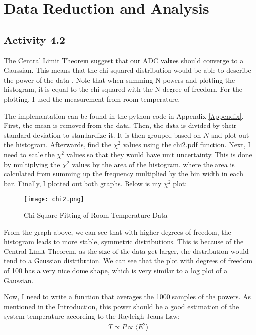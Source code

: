 \documentclass[10pt, preprint]{aastex}
\begin{document}
\section{Data Reduction and Analysis}\label{sec:reduction}

\subsection{Activity 4.2}

The Central Limit Theorem suggest that our ADC values should converge to a Gaussian. This means that the chi-squared distribution would be able to describe the power of the data \cite{labmanual}. Note that when summing N powers and plotting the histogram, it is equal to the chi-squared with the N degree of freedom. For the plotting, I used the measurement from room temperature. 

The implementation can be found in the python code in Appendix \ref{Appendix}. First, the mean is removed from the data. Then, the data is divided by their standard deviation to standardize it. It is then grouped based on $N$ and plot out the histogram. Afterwards, find the $\chi^2$ values using the chi2.pdf function. Next, I need to scale the $\chi^2$ values so that they would have unit uncertainty. This is done by multiplying the $\chi^2$ values by the area of the histogram, where the area is calculated from summing up the frequency multiplied by the bin width in each bar. Finally, I plotted out both graphs. Below is my $\chi^2$ plot:

\begin{figure}[H]
\centering
\texttt{[image: chi2.png]}
\caption{\label{fig:chi2}Chi-Square Fitting of Room Temperature Data}
\end{figure}

From the graph above, we can see that with higher degrees of freedom, the histogram leads to more stable, symmetric distributions. This is because of the Central Limit Theorem, as the size of the data get larger, the distribution would tend to a Gaussian distribution. We can see that the plot with degrees of freedom of 100 has a very nice dome shape, which is very similar to a log plot of a Gaussian. 

Now, I need to write a function that averages the 1000 samples of the powers. As mentioned in the Introduction, this power should be a good estimation of the system temperature according to the Rayleigh-Jeans Law:
\begin{align}
    T \propto P \propto \langle E^2 \rangle
\end{align}
\end{document}
